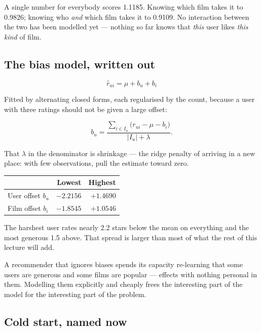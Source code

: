 \documentclass[11pt,a4paper]{article}
\begin{document}
A single number for everybody scores 1.1185. Knowing which film takes it to
0.9826; knowing who \emph{and} which film takes it to 0.9109. No interaction
between the two has been modelled yet --- nothing so far knows that
\emph{this} user likes \emph{this kind} of film.

\subsection{The bias model, written out}

\[ \hat r_{ui} = \mu + b_u + b_i \]

Fitted by alternating closed forms, each regularised by the count, because a
user with three ratings should not be given a large offset:

\[
  b_u = \frac{\sum_{i \in I_u}\big(r_{ui} - \mu - b_i\big)}{|I_u| + \lambda}.
\]

That $\lambda$ in the denominator is shrinkage --- the ridge penalty of
 arriving in a new place: with few observations, pull the estimate
toward zero.

\begin{center}
\small
\begin{tabular}{lrr}
\toprule
 & \textbf{Lowest} & \textbf{Highest} \\
\midrule
User offset $b_u$ & $-2.2156$ & $+1.4690$ \\
Film offset $b_i$ & $-1.8545$ & $+1.0546$ \\
\bottomrule
\end{tabular}
\end{center}

The harshest user rates nearly 2.2 stars below the mean on everything and the
most generous 1.5 above. That spread is larger than most of what the rest of
this lecture will add.

\begin{keybox}[title={Why this matters more than it looks}]
A recommender that ignores biases spends its capacity re-learning that some
users are generous and some films are popular --- effects with nothing personal
in them. Modelling them explicitly and cheaply frees the interesting part of
the model for the interesting part of the problem.
\end{keybox}

\subsection{Cold start, named now}
\end{document}
